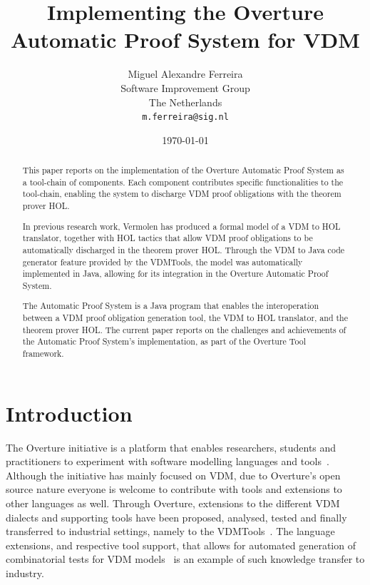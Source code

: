 \documentclass[]{article}
\title{Implementing the Overture Automatic Proof System for VDM}
\author{Miguel Alexandre Ferreira\\
        Software Improvement Group\\
		The Netherlands\\ 
		\texttt{m.ferreira@sig.nl}}
\date{\today}
\begin{document}
\maketitle
\begin{abstract}
This paper reports on the implementation of the Overture Automatic Proof System as a tool-chain of components.
Each component contributes specific functionalities to the tool-chain, enabling the system to discharge VDM proof obligations with the theorem prover HOL.

In previous research work, Vermolen has produced a formal model of a VDM to HOL translator, together with HOL tactics that allow VDM proof obligations to be automatically discharged in the theorem prover HOL.
Through the VDM to Java code generator feature provided by the VDMTools, the model was automatically implemented in Java, allowing for its integration in the Overture Automatic Proof System.

The Automatic Proof System is a Java program that enables the interoperation between a VDM proof obligation generation tool, the VDM to HOL translator, and the theorem prover HOL.
The current paper reports on the challenges and achievements of the Automatic Proof System's implementation, as part of the Overture Tool framework.
\end{abstract}

\section{Introduction}
\label{sec:introduction}

The Overture initiative is a platform that enables researchers, students and practitioners to experiment with software modelling languages and tools~\cite{LarsenBFL08}.
Although the initiative has mainly focused on VDM, due to Overture's open source nature everyone is welcome to contribute with tools and extensions to other languages as well.
Through Overture, extensions to the different VDM dialects and supporting tools have been proposed, analysed, tested and finally transferred to industrial settings, namely to the VDMTools~\cite{DBLP:journals/sigplan/FitzgeraldLS08}.
The language extensions, and respective tool support, that allows for automated generation of combinatorial tests for VDM models~\cite{Larsen&09a} is an example of such knowledge transfer to industry.
\end{document}
